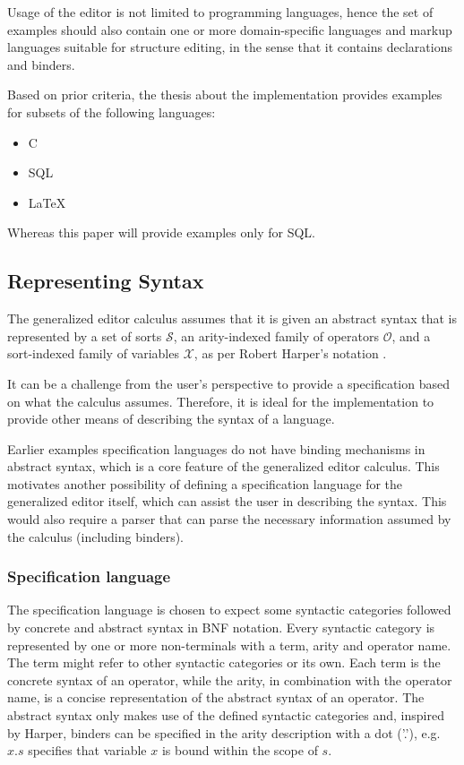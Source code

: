 \documentclass[sigplan,review]{acmart}
\begin{document}
Usage of the editor is not limited to programming languages, hence the set of examples should also contain one or more domain-specific languages and markup languages suitable for structure editing, in the sense that it contains declarations and binders.

Based on prior criteria, the thesis about the implementation\cite{sunemsc} provides examples for subsets of the following languages:
\begin{itemize}
    \item C\cite{c-iso-standard}
    \item SQL\cite{postgresql-about}
    \item \LaTeX\cite{latex-about}
\end{itemize}
Whereas this paper will provide examples only for SQL.

\subsection{Representing Syntax}
The generalized editor calculus assumes that it is given an abstract syntax that is represented by a set of sorts $\mathcal{S}$, an arity-indexed family of operators $\mathcal{O}$, and a sort-indexed family of variables $\mathcal{X}$, as per Robert Harper's notation \cite{harper_foundations}.

It can be a challenge from the user's perspective to provide a specification based on what the calculus assumes. Therefore, it is ideal for the implementation to provide other means of describing the syntax of a language.

Earlier examples specification languages do not have binding mechanisms in abstract syntax, which is a core feature of the generalized editor calculus. This motivates another possibility of defining a specification language for the generalized editor itself, which can assist the user in describing the syntax. This would also require a parser that can parse the necessary information assumed by the calculus (including binders).

\subsubsection{Specification language}

The specification language is chosen to expect some syntactic categories followed by concrete and abstract syntax in BNF notation.  %
Every syntactic category is represented by one or more non-terminals with a term, arity and operator name. The term might refer to other syntactic categories or its own. Each term is the concrete syntax of an operator, while the arity, in combination with the operator name, is a concise representation of the abstract syntax of an operator.
The abstract syntax only makes use of the defined syntactic categories and, inspired by Harper\cite{harper_foundations}, binders can be specified in the arity description with a dot ('.'), e.g. $x.s$ specifies that variable $x$ is bound within the scope of $s$.
\end{document}
